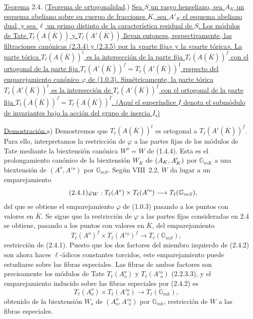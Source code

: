 \medskip
\noindent
\underline{Teorema} 2.4. (\underline{Teorema de ortogonalidad}.)
\underline{Sea $S$ un rasgo henseliano, sea $A_K$ un esquema abeliano
sobre su cuerpo de fracciones $K$, sea $A'_K$ el esquema abeliano dual,
y sea $\ell$ un primo distinto de la característica residual de $S$.
Los módulos de Tate $T_\ell(A(\overline K))$ y
$T_\ell(A'(\overline K))$ llevan entonces, respectivamente, las
filtraciones canónicas (2.3.4) y (2.3.5) por la «parte fija» y la «parte
tórica». La parte tórica $T_\ell(A(\overline K))^t$ es la intersección
de la parte fija $T_\ell(A(\overline K))^f$ con el ortogonal de la parte
fija $T_\ell(A'(\overline K))^f=T_\ell(A'(\overline K))^I$ respecto del
emparejamiento canónico $\varphi$ de (1.0.3). Simétricamente, la parte
tórica $T_\ell(A'(\overline K))^t$ es la intersección de
$T_\ell(A'(\overline K))^f$ con el ortogonal de la parte fija
$T_\ell(A(\overline K))^f=T_\ell(A(\overline K))^I$. (Aquí el
superíndice $I$ denota el submódulo de invariantes bajo la acción del
grupo de inercia $I$.)}

\smallskip
\noindent
\underline{Demostración.}\quad a) Demostremos que
$T_\ell(A(\overline K))^t$ es ortogonal a
$T_\ell(A'(\overline K))^f$. Para ello, interpretamos la restricción
de $\varphi$ a las partes fijas de los módulos de Tate mediante la
biextensión canónica $W^o=W$ de (1.4.4). Esta es el prolongamiento
canónico de la biextensión $W_K$ de $(A_K\sisi{;}{,}A'_K)$ por $\mathbb G_{mK}$
a una biextensión de $(A^o,A'{}^o)$ por $\mathbb G_{mS}$. Según
VIII~2.2, $W$ da lugar a un emparejamiento
\begin{equation}\tag{2.4.1}
 \varphi_{\sisi{w}{W}}:T_\ell(A^o)\times T_\ell(A'{}^o)
 \longrightarrow T_\ell(\mathbb G_{mS}),
\end{equation}
del que se obtiene el emparejamiento $\varphi$ de (1.0.3) pasando a los
puntos con valores en $\overline K$. Se sigue que la restricción de
$\varphi$ a las partes fijas consideradas en 2.4 se obtiene, pasando a
los puntos con valores en $\overline K$, del emparejamiento
\begin{equation}\tag{2.4.2}
 T_\ell(A^o)^f\times T_\ell(A'{}^o)^f
 \longrightarrow T_\ell(\mathbb G_{mS}),
\end{equation}
restricción de (2.4.1). Puesto que los dos factores del miembro
izquierdo de (2.4.2) son ahora haces $\ell$-ádicos constantes torcidos,
este emparejamiento puede estudiarse sobre las fibras especiales. Las
fibras de ambos factores son precisamente los módulos de Tate
$T_\ell(A_o^o)$ y $T_\ell(A'{}_o^o)$ (2.2.3.3), y el emparejamiento
inducido sobre las fibras especiales por (2.4.2) es
\begin{equation}\tag{2.4.3}
 T_\ell(A_o^o)\times T_\ell(A'{}_o^o)
 \longrightarrow T_\ell(\mathbb G_{mk}),
\end{equation}
obtenido de la biextensión $W_o$ de $(A_o^o,A'{}_o^o)$ por
$\mathbb G_{mk}$, restricción de $W$ a las fibras especiales.

